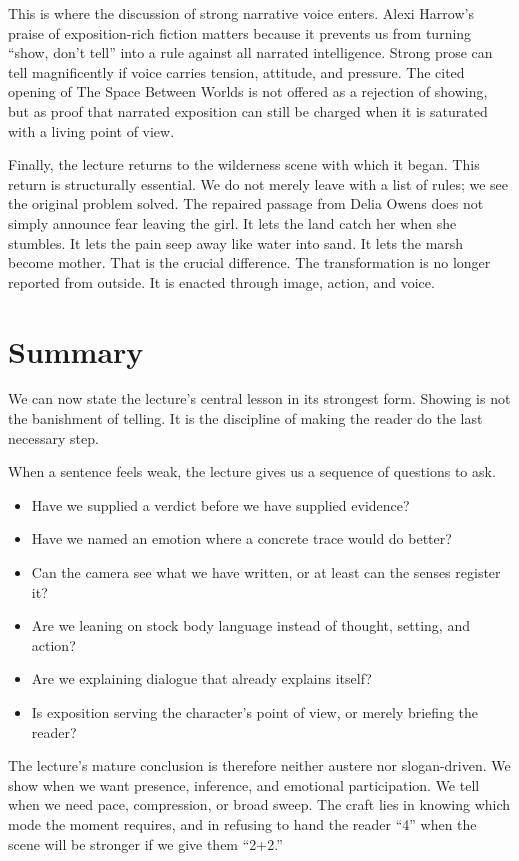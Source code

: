 This is where the discussion of strong narrative voice enters. Alexi Harrow's praise of exposition-rich fiction matters because it prevents us from turning ``show, don't tell'' into a rule against all narrated intelligence. Strong prose can tell magnificently if voice carries tension, attitude, and pressure. The cited opening of The Space Between Worlds is not offered as a rejection of showing, but as proof that narrated exposition can still be charged when it is saturated with a living point of view.

Finally, the lecture returns to the wilderness scene with which it began. This return is structurally essential. We do not merely leave with a list of rules; we see the original problem solved. The repaired passage from Delia Owens does not simply announce fear leaving the girl. It lets the land catch her when she stumbles. It lets the pain seep away like water into sand. It lets the marsh become mother. That is the crucial difference. The transformation is no longer reported from outside. It is enacted through image, action, and voice.

\section{Summary}

We can now state the lecture's central lesson in its strongest form. Showing is not the banishment of telling. It is the discipline of making the reader do the last necessary step.

When a sentence feels weak, the lecture gives us a sequence of questions to ask.

\begin{itemize}
\item Have we supplied a verdict before we have supplied evidence?
\item Have we named an emotion where a concrete trace would do better?
\item Can the camera see what we have written, or at least can the senses register it?
\item Are we leaning on stock body language instead of thought, setting, and action?
\item Are we explaining dialogue that already explains itself?
\item Is exposition serving the character's point of view, or merely briefing the reader?
\end{itemize}

The lecture's mature conclusion is therefore neither austere nor slogan-driven. We show when we want presence, inference, and emotional participation. We tell when we need pace, compression, or broad sweep. The craft lies in knowing which mode the moment requires, and in refusing to hand the reader ``4'' when the scene will be stronger if we give them ``2+2.''